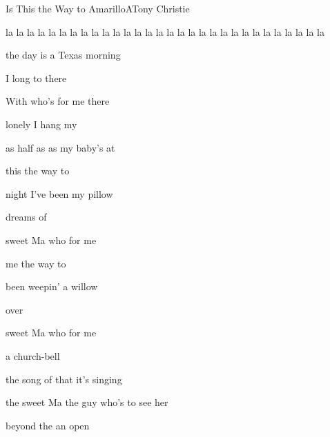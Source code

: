 \begin{SBSong}{Is This the Way to Amarillo}{A}{Tony Christie}

  \begin{SBVerse}
     la la la  la la la   la la la  la la la  
     la  la la la  la la la la la la la  la la la la la la la
  \end{SBVerse}

  \begin{SBVerse}
     the day is   a Texas  morning

     I long to  there

    With  who's  for me there

     lonely   I hang my 

     as half as  as  my baby's at
  \end{SBVerse}

  \begin{SBChorus}
     this the way to 

     night I've been  my pillow

     dreams of 

     sweet Ma who  for me

     me the way to 

     been weepin'  a willow

     over 

     sweet Ma who  for me
  \end{SBChorus}

  \begin{SBVerse}
     a church-bell 

     the song of  that it's singing

     the sweet Ma  the guy who's  to see her

     beyond the   an open 


\end{SBVerse}
\end{SBSong}
